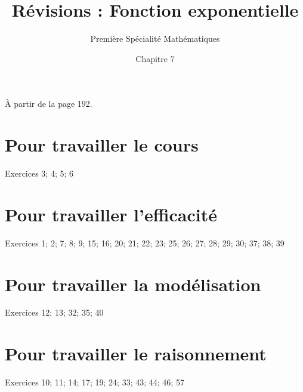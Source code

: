 \documentclass{exos}
\title{Révisions : Fonction exponentielle}
\author{Première Spécialité Mathématiques}
\date{Chapitre 7}
\begin{document}
\maketitle
À partir de la page 192.
\section{Pour travailler le cours}
Exercices 3; 4; 5; 6

\section{Pour travailler l'efficacité}
Exercices 1; 2; 7; 8; 9; 15; 16; 20; 21; 22; 23; 25; 26; 27; 28; 29; 30; 37; 38; 39

\section{Pour travailler la modélisation}
Exercices 12; 13; 32; 35; 40

\section{Pour travailler le raisonnement}
Exercices 10; 11; 14; 17; 19; 24; 33; 43; 44; 46; 57
\end{document}
